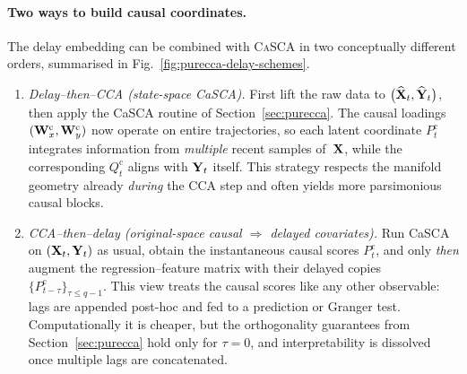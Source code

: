 \documentclass[14pt]{extarticle}
\begin{document}
	\paragraph{Two ways to build causal coordinates.}
	The delay embedding can be combined with \textsc{CaSCA} in two
	conceptually different orders, summarised in
	Fig.~\ref{fig:purecca-delay-schemes}.
	
	\begin{enumerate}[label=\textbf{Schema \roman*.}]
		\item \emph{Delay--then–CCA (state-space CaSCA).}  
		First lift the raw data to $\bigl(\widehat{\mathbf{X}}_t,\widehat{\mathbf{Y}}_t\bigr)$,
		then apply the CaSCA routine of Section~\ref{sec:purecca}.  
		The causal loadings $(\mathbf{W}_x^{\mathrm c},\mathbf{W}_y^{\mathrm c})$ now
		operate on entire trajectories, so each latent coordinate
		$P_t^{\mathrm c}$ integrates information from \emph{multiple} recent
		samples of~$\mathbf{X}$, while the corresponding $Q_t^{\mathrm c}$ aligns
		with $\mathbf{Y}_t$ itself.  
		This strategy respects the manifold geometry already \emph{during}
		the CCA step and often yields more parsimonious causal blocks.
		
		\item \emph{CCA--then–delay (original-space causal $\Rightarrow$ delayed covariates).}  
		Run CaSCA on $(\mathbf{X}_t,\mathbf{Y}_t)$ as usual, obtain the
		instantaneous causal scores $P_t^{\mathrm c}$, and only \emph{then}
		augment the regression–feature matrix with their delayed copies
		$\bigl\{P_{t-\tau}^{\mathrm c}\bigr\}_{\tau\le q-1}$.  
		This view treats the causal scores like any other observable:
		lags are appended post-hoc and fed to a prediction or Granger test.
		Computationally it is cheaper, but the orthogonality guarantees from
		Section~\ref{sec:purecca} hold only for $\tau=0$, and
		interpretability is dissolved once multiple lags are concatenated.
	\end{enumerate}
	
\end{document}
